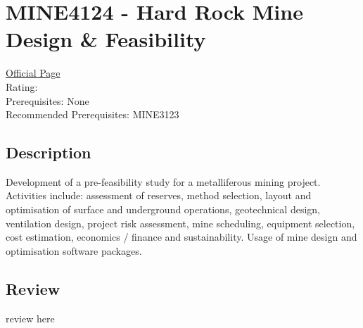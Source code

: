 \hypertarget{MINE4124}{\section{MINE4124 - Hard Rock Mine Design \& Feasibility}}

\large
\textcolor{turbo_purple}{\href{https://my.uq.edu.au/programs-courses/course.html?course_code=MINE4124}{Official Page}} \\
Rating: \cstar\cstar\cstar\cstar\ostar \\
Prerequisites: None \\
Recommended Prerequisites: MINE3123

\normalsize
\subsection*{Description}
Development of a pre-feasibility study for a metalliferous mining project.
Activities include: assessment of reserves, method selection, layout and optimisation of surface and underground operations, geotechnical design, ventilation design, project risk assessment, mine scheduling, equipment selection, cost estimation, economics / finance and sustainability.
Usage of mine design and optimisation software packages.

\subsection*{Review}
review here
